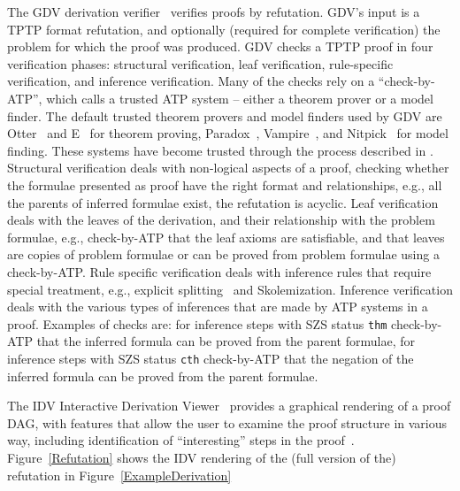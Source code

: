 \documentclass[runningheads]{llncs}
\newcommand{\smalltt}[1]{\small \texttt{#1}}
\begin{document}
The GDV derivation verifier~\cite{Sut06} verifies proofs by refutation.
GDV's input is a TPTP format refutation, and optionally (required for complete verification) the 
problem for which the proof was produced.
GDV checks a TPTP proof in four verification phases: structural verification, leaf verification,
rule-specific verification, and inference verification.
Many of the checks rely on a ``check-by-ATP'', which calls a trusted ATP system -- either a theorem 
prover or a model finder.
The default trusted theorem provers and model finders used by GDV are Otter~\cite{McC03-Otter}
and E~\cite{SCV19} for theorem proving, Paradox~\cite{CS18}, Vampire~\cite{KV13}, and
Nitpick~\cite{BN10-ITP} for model finding.
These systems have become trusted through the process described in \cite{SBB25}.
Structural verification deals with non-logical aspects of a proof, checking whether the
formulae presented as proof have the right format and relationships, e.g., all the parents of 
inferred formulae exist, the refutation is acyclic. 
Leaf verification deals with the leaves of the derivation, and their relationship with
the problem formulae, e.g., check-by-ATP that the leaf axioms are satisfiable, and that leaves 
are copies of problem formulae or can be proved from problem formulae using a check-by-ATP.
Rule specific verification deals with inference rules that require special treatment, e.g.,
explicit splitting~\cite{Wei01} and Skolemization. 
Inference verification deals with the various types of inferences that are made by ATP
systems in a proof.
Examples of checks are: for inference steps with SZS status {\smalltt{thm}} check-by-ATP that the 
inferred formula can be proved from the parent formulae, for inference steps with SZS status 
{\smalltt{cth}} check-by-ATP that the negation of the inferred formula can be proved from the 
parent formulae.


The IDV Interactive Derivation Viewer~\cite{TPS07} provides a graphical rendering of a proof
DAG, with features that allow the user to examine the proof structure in various way, 
including identification of ``interesting'' steps in the proof~\cite{PGS06}.
Figure~\ref{Refutation} shows the IDV rendering of the (full version of the) refutation in 
Figure~\ref{ExampleDerivation}
\end{document}
